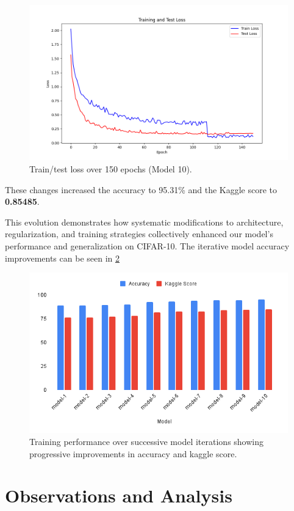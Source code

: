 \documentclass[letterpaper]{article}
\begin{document}
\begin{enumerate}
    \begin{figure}[h]
    \centering
        \includegraphics[width=0.9\linewidth]{train_test_loss_95.31.png}
    \caption{Train/test loss over 150 epochs (Model 10).}
    \label{fig:training_performance}
    \end{figure}
\end{enumerate}

These changes increased the accuracy to 95.31\% and the Kaggle score to \textbf{0.85485}.

This evolution demonstrates how systematic modifications to architecture, regularization, and training strategies collectively enhanced our model's performance and generalization on CIFAR-10. The iterative model accuracy improvements can be seen in \ref{fig:all_iterations}

\begin{figure}[ht]
\centering
\includegraphics[width=0.8\linewidth]{accuracy_charts.png}
\caption{Training performance over successive model iterations showing progressive improvements in accuracy and kaggle score.}
\label{fig:all_iterations}
\end{figure}

\section{Observations and Analysis}
\end{document}
